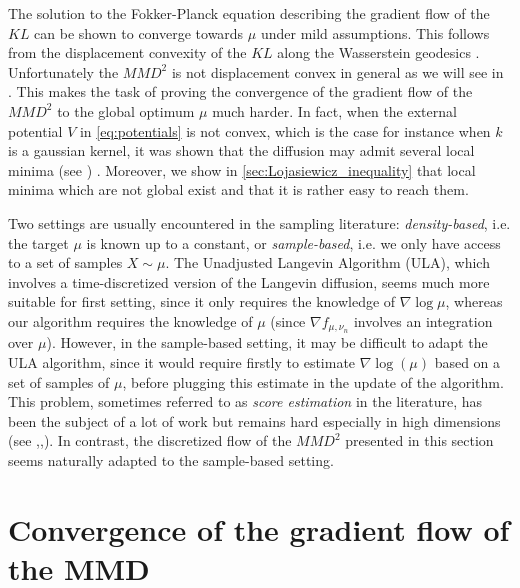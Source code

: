 	
	The solution to the Fokker-Planck equation describing the gradient flow of the $KL$ can be shown to converge towards $\mu$ under mild assumptions. This follows from the displacement convexity of the $KL$ along the Wasserstein geodesics . Unfortunately the $MMD^2$ is not displacement convex in general as we will see in . This makes the task of proving the convergence of the gradient flow of the $MMD^2$ to the global optimum $\mu$ much harder. In fact, when the external potential $V$ in \cref{eq:potentials} is not convex, which is the case for instance when $k$ is a gaussian kernel, it was shown that the diffusion may admit several local minima (see \cite{herrmann2010non,tugaut2014phase}) . Moreover, we show in \cref{sec:Lojasiewicz_inequality} that local minima which are not global exist and that it is rather easy to reach them.
\begin{remark}
	Two settings are usually encountered in the sampling literature: \textit{density-based}, i.e. the target $\mu$ is known up to a constant, or \textit{sample-based}, i.e. we only have access to a set of samples $X \sim \mu$.
	The Unadjusted Langevin Algorithm (ULA), which involves a time-discretized version of the Langevin diffusion, seems much more suitable for first setting, since it only requires the knowledge of $\nabla \log \mu$, whereas our algorithm requires the knowledge of $\mu$ (since $\nabla f_{\mu, \nu_n}$ involves an integration over $\mu$). However, in the sample-based setting, it may be difficult to adapt the ULA algorithm, since it would require firstly to estimate $\nabla \log(\mu)$ based on a set of samples of $\mu$, before plugging this estimate in the update of the algorithm. This problem, sometimes referred to as \textit{score estimation} in the literature, has been the subject of a lot of work but remains hard especially in high dimensions (see \cite{sutherland2017efficient},\cite{li2018gradient},\cite{shi2018spectral}). In contrast, the discretized flow of the $MMD^2$ presented in this section seems naturally adapted to the sample-based setting.
\end{remark}







\section{Convergence of the gradient flow of the MMD}
